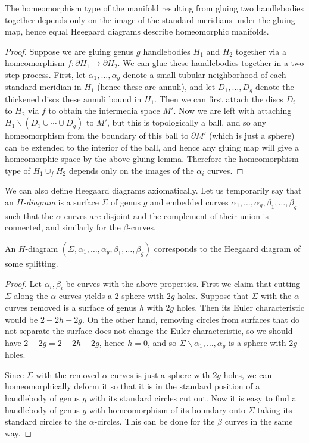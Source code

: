 \begin{thm}
\label{isomorphic heegaard diagrams give homeomorphic manifolds}
The homeomorphism type of the manifold resulting from gluing two handlebodies together depends only on the image of the standard meridians under the gluing map, hence equal Heegaard diagrams describe homeomorphic manifolds.
\end{thm}
\begin{proof}
Suppose we are gluing genus $g$ handlebodies $H_1$ and $H_2$ together via a homeomorphism $f : \partial H_1 \rightarrow \partial H_2$. We can glue these handlebodies together in a two step process. First, let $\alpha_1,\ldots,\alpha_g$ denote a small tubular neighborhood of each standard meridian in $H_1$ (hence these are annuli), and let $D_1,\ldots,D_g$ denote the thickened discs these annuli bound in $H_1$. Then we can first attach the discs $D_i$ to $H_2$ via $f$ to obtain the intermedia space $M'$. Now we are left with attaching $H_1 \backslash (D_1 \cup \cdots \cup D_g)$ to $M'$, but this is topologically a ball, and so any homeomorphism from the boundary of this ball to $\partial M'$ (which is just a sphere) can be extended to the interior of the ball, and hence any gluing map will give a homeomorphic space by the above gluing lemma. Therefore the homeomorphism type of $H_1 \cup_f H_2$ depends only on the images of the $\alpha_i$ curves.
\end{proof}


We can also define Heegaard diagrams axiomatically. Let us temporarily say that an \emph{$H$-diagram} is a surface $\Sigma$ of genus $g$ and embedded curves $\alpha_1,\ldots,\alpha_g,\beta_1,\ldots,\beta_g$ such that the $\alpha$-curves are disjoint and the complement of their union is connected, and similarly for the $\beta$-curves.
\begin{thm}
An $H$-diagram $(\Sigma,\alpha_1,\ldots,\alpha_g,\beta_1,\ldots,\beta_g)$ corresponds to the Heegaard diagram of some splitting.
\end{thm}
\begin{proof}
Let $\alpha_i,\beta_i$ be curves with the above properties. First we claim that cutting $\Sigma$ along the $\alpha$-curves yields a 2-sphere with $2g$ holes. Suppose that $\Sigma$ with the $\alpha$-curves removed is a surface of genus $h$ with $2g$ holes. Then its Euler characteristic would be $2-2h-2g$. On the other hand, removing circles from surfaces that do not separate the surface does not change the Euler characteristic, so we should have $2-2g=2-2h-2g$, hence $h=0$, and so $\Sigma \backslash \alpha_1,\ldots,\alpha_g$ is a sphere with $2g$ holes.

Since $\Sigma$ with the removed $\alpha$-curves is just a sphere with $2g$ holes, we can homeomorphically deform it so that it is in the standard position of a handlebody of genus $g$ with its standard circles cut out. Now it is easy to find a handlebody of genus $g$ with homeomorphism of its boundary onto $\Sigma$ taking its standard circles to the $\alpha$-circles. This can be done for the $\beta$ curves in the same way.
\end{proof}

